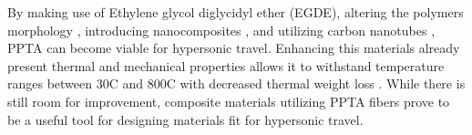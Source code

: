 \documentclass[12pt]{article}
\begin{document}
\indent By making use of Ethylene glycol diglycidyl ether (EGDE)\citep{LeiWang2017}, altering the polymers morphology \citep{Kanbargi2017}, introducing nanocomposites \citep{BoZhang2021}, and utilizing carbon nanotubes \citep{Yang2019}, PPTA can become viable for hypersonic travel. Enhancing this materials already present thermal and mechanical properties allows it to withstand temperature ranges between 30\degree C and 800\degree C with decreased thermal weight loss \citep{ShushengChen2014}. While there is still room for improvement, composite materials utilizing PPTA fibers prove to be a useful tool for designing materials fit for hypersonic travel.


 
\end{document}
